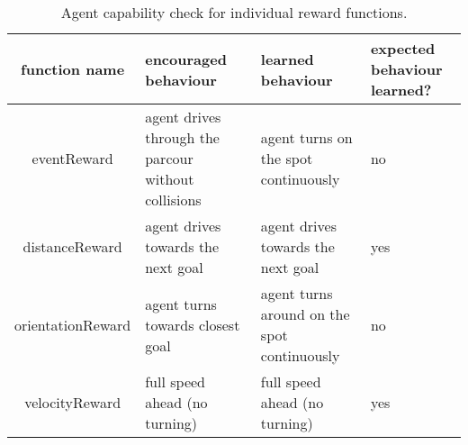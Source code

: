 \begin{table}
\caption{Agent capability check for individual reward functions.}
\begin{center}
\begin{tabular}{|| c | p{} | p{} | p{} ||} 
    \hline
    function name & encouraged behaviour & learned behaviour  & expected behaviour learned? \\ [0.5ex] 
    \hline\hline
    eventReward &  agent drives through the parcour without collisions & agent turns on the spot continuously & no \\ 
    \hline
    distanceReward & agent drives towards the next goal & agent drives towards the next goal & yes \\
    \hline
    orientationReward & agent turns towards closest goal & agent turns around on the spot continuously & no \\
    \hline
    velocityReward  & full speed ahead (no turning) & full speed ahead (no turning) & yes \\
    \hline
\end{tabular}
\end{center}
\label{table:reward_functions_behaviour}
\end{table}